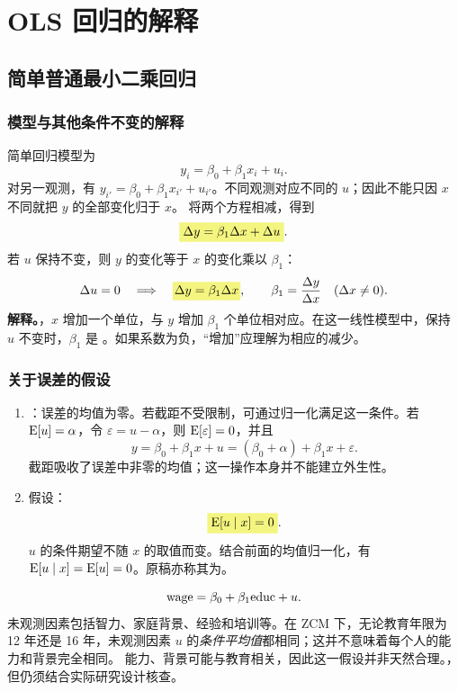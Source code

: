 \chapter{OLS 回归的解释}
\label{ch:week2}
\section{简单普通最小二乘回归}
\label{sec:simple-interpretation}
\subsection{模型与其他条件不变的解释}
简单回归模型为
\begin{equation}\label{eq:simple-model}
 y_i=\beta_0+\beta_1x_i+u_i.
\end{equation}
对另一观测，有 $y_{i'}=\beta_0+\beta_1x_{i'}+u_{i'}$。不同观测对应不同的 $u$；因此不能只因 $x$ 不同就把 $y$ 的全部变化归于 $x$。
将两个方程相减，得到
\[\hm{\Delta y=\beta_1\Delta x+\Delta u}.\]
若 $u$ 保持不变，则 $y$ 的变化等于 $x$ 的变化乘以 $\beta_1$：
\[\Delta u=0\quad\Longrightarrow\quad
\hy{$\Delta y=\beta_1\Delta x$},\qquad
\beta_1=\frac{\Delta y}{\Delta x}\quad(\Delta x\ne0).\]
\textbf{解释。}，$x$ 增加一个单位，与 $y$ 增加 $\beta_1$ 个单位相对应。在这一线性模型中，保持 $u$ 不变时，$\beta_1$ 是 。如果系数为负，“增加”应理解为相应的减少。

\subsection{关于误差的假设}
\begin{enumerate}
\item {}：误差的均值为零。若截距不受限制，可通过归一化满足这一条件。若 $\operatorname{E}[u]=\alpha$，令 $\varepsilon=u-\alpha$，则 $\operatorname{E}[\varepsilon]=0$，并且
\[y=\beta_0+\beta_1x+u=(\beta_0+\alpha)+\beta_1x+\varepsilon.\]
截距吸收了误差中非零的均值；这一操作本身并不能建立外生性。
\item {}假设：
\begin{equation}\label{eq:zcm-simple}
\hm{\E[u\mid x]=0}.
\end{equation}
$u$ 的条件期望不随 $x$ 的取值而变。结合前面的均值归一化，有 $\operatorname{E}[u\mid x]=\operatorname{E}[u]=0$。原稿亦称其为。
\end{enumerate}
\begin{example}[教育与工资]
\[\mathrm{wage}=\beta_0+\beta_1\mathrm{educ}+u.\]
未观测因素包括智力、家庭背景、经验和培训等。在 ZCM 下，无论教育年限为 12 年还是 16 年，未观测因素 $u$ 的\emph{条件平均值}都相同；这并不意味着每个人的能力和背景完全相同。
能力、背景可能与教育相关，因此这一假设并非天然合理。，但仍须结合实际研究设计核查。
\end{example}

